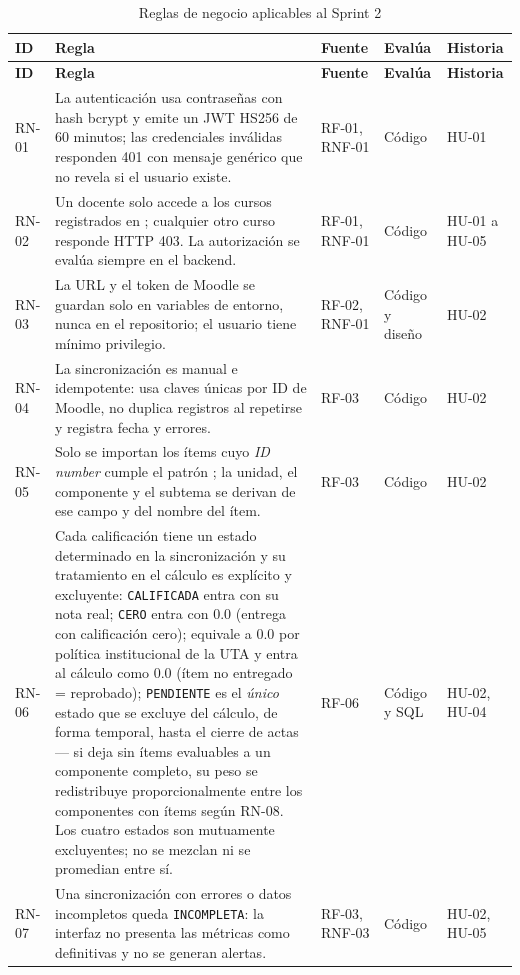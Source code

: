 \documentclass[11pt,a4paper]{article}
\newcommand{\hd}[1]{\textbf{#1}}
\begin{document}
\begin{longtable}{|R{1.3cm}|R{7.4cm}|R{1.9cm}|R{1.7cm}|R{1.7cm}|}
\caption{Reglas de negocio aplicables al Sprint 2}\\
\hline \hd{ID} & \hd{Regla} & \hd{Fuente} & \hd{Evalúa} & \hd{Historia}\\ \hline \endfirsthead
\hline \hd{ID} & \hd{Regla} & \hd{Fuente} & \hd{Evalúa} & \hd{Historia}\\ \hline \endhead
RN-01 & La autenticación usa contraseñas con hash bcrypt y emite un JWT HS256 de 60 minutos; las credenciales inválidas responden 401 con mensaje genérico que no revela si el usuario existe. & RF-01, RNF-01 & Código & HU-01\\ \hline
RN-02 & Un docente solo accede a los cursos registrados en ; cualquier otro curso responde HTTP 403. La autorización se evalúa siempre en el backend. & RF-01, RNF-01 & Código & HU-01 a HU-05\\ \hline
RN-03 & La URL y el token de Moodle se guardan solo en variables de entorno, nunca en el repositorio; el usuario  tiene mínimo privilegio. & RF-02, RNF-01 & Código y diseño & HU-02\\ \hline
RN-04 & La sincronización es manual e idempotente: usa claves únicas por ID de Moodle, no duplica registros al repetirse y registra fecha y errores. & RF-03 & Código & HU-02\\ \hline
RN-05 & Solo se importan los ítems cuyo \emph{ID number} cumple el patrón ; la unidad, el componente y el subtema se derivan de ese campo y del nombre del ítem. & RF-03 & Código & HU-02\\ \hline
RN-06 & Cada calificación tiene un estado determinado en la sincronización y su tratamiento en el cálculo es explícito y excluyente: \texttt{CALIFICADA} entra con su nota real; \texttt{CERO} entra con 0.0 (entrega con calificación cero);  equivale a 0.0 por política institucional de la UTA y entra al cálculo como 0.0 (ítem no entregado = reprobado); \texttt{PENDIENTE} es el \emph{único} estado que se excluye del cálculo, de forma temporal, hasta el cierre de actas --- si deja sin ítems evaluables a un componente completo, su peso se redistribuye proporcionalmente entre los componentes con ítems según RN-08. Los cuatro estados son mutuamente excluyentes; no se mezclan ni se promedian entre sí. & RF-06 & Código y SQL & HU-02, HU-04\\ \hline
RN-07 & Una sincronización con errores o datos incompletos queda \texttt{INCOMPLETA}: la interfaz no presenta las métricas como definitivas y no se generan alertas. & RF-03, RNF-03 & Código & HU-02, HU-05\\ \hline

\end{longtable}
\end{document}
